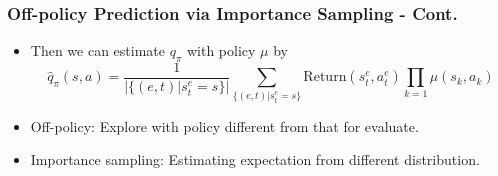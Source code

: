 \begin{frame}
  \frametitle{Off-policy Prediction via Importance Sampling - Cont.}
  \begin{itemize}
  \item Then we can estimate $q_\pi$ with policy $\mu$ by
    \begin{equation*}
      \hat{q}_\pi(s, a) = \frac{1}{|\{(e, t) | s^{e}_{t} = s\}|} \sum_{\{(e, t) | s^{e}_{t} = s\}} \mathrm{Return}(s^e_t, a^e_t) \prod_{k=1} \mu(s_k, a_k)
    \end{equation*}
  \item Off-policy: Explore with policy different from that for evaluate.
  \item Importance sampling: Estimating expectation from different distribution.
  \end{itemize}
\end{frame}

